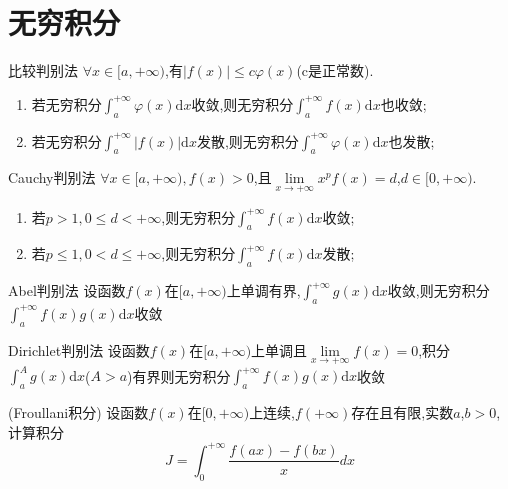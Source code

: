 \chapter{无穷积分}

\begin{theorem}{比较判别法}
	$\forall x\in [a,+\infty)$,有$|f(x)|\le c\varphi (x)$(c是正常数).
	\begin{enumerate}
		\item 若无穷积分$
			      \int_a^{+\infty}{\varphi \left( x \right) \text{d}x}
		      $收敛,则无穷积分$
			      \int_a^{+\infty}{f \left( x \right) \text{d}x}
		      $也收敛;
		\item 若无穷积分$
			      \int_a^{+\infty}{|f \left( x \right)| \text{d}x}
		      $发散,则无穷积分$
			      \int_a^{+\infty}{\varphi \left( x \right) \text{d}x}
		      $也发散;
	\end{enumerate}
\end{theorem}

\begin{theorem}{Cauchy判别法}
	$\forall x\in [a,+\infty),f(x)>0$,且$
		\lim\limits_{x\rightarrow +\infty}x^pf\left( x \right) =d
	$,$d \in [0,+\infty)$.
	\begin{enumerate}
		\item 若$p>1,0\le d<+\infty$,则无穷积分$
			      \int_a^{+\infty}{f \left( x \right) \text{d}x}
		      $收敛;
		\item 若$p\le 1,0< d\le+\infty$,则无穷积分$
			      \int_a^{+\infty}{f \left( x \right) \text{d}x}
		      $发散;
	\end{enumerate}
\end{theorem}

\begin{theorem}{Abel判别法}
	设函数$f(x)$在$[a,+\infty)$上单调有界,$
		\int_a^{+\infty}{g \left( x \right) \text{d}x}
	$收敛,则无穷积分$
		\int_a^{+\infty}{f(x)g \left( x \right) \text{d}x}
	$收敛
\end{theorem}

\begin{theorem}{Dirichlet判别法}
	设函数$f(x)$在$[a,+\infty)$上单调且$
		\lim\limits_{x\rightarrow +\infty}f\left( x \right) =0
	$,积分$
		\int_a^{A}{g \left( x \right) \text{d}x}
	$($A>a$)有界则无穷积分$
		\int_a^{+\infty}{f(x)g \left( x \right) \text{d}x}
	$收敛
\end{theorem}

\begin{example}
	(Froullani积分) 设函数$f(x)$在$[0,+\infty)$上连续,$f(+\infty)$存在且有限,实数$a$,$b>0$,计算积分
	$$
		J=\int_0^{+\infty}{\frac{f\left( ax \right) -f\left( bx \right)}{x}dx}
	$$
\end{example}

